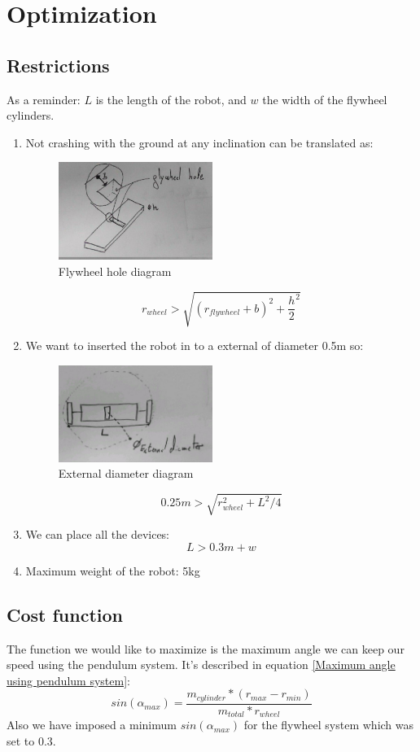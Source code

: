 \section{Optimization}

\subsection{Restrictions}
As a reminder: $L$ is the length of the robot, and $w$ the width of the flywheel cylinders.
\begin{enumerate}
\item Not crashing with the ground at any inclination can be translated as:
\begin{figure}[ht]
	\centering
	\includegraphics[width=5cm]{img/flywheel_hole.jpg}
	\caption{Flywheel hole diagram}
	\label{fig:Flywheel hole diagram}
\end{figure}
\[r_{wheel}> \sqrt{(r_{flywheel} + b)^2+\frac{h}{2}^2}\]
\item We want to inserted the robot in to a external of diameter 0.5m so:
\begin{figure}[ht]
	\centering
	\includegraphics[width=5cm]{img/external_diameter.jpg}
	\caption{External diameter diagram}
	\label{fig:External diameter diagram}
\end{figure}
\[0.25 m > \sqrt{r_{wheel}^2 + L^2/4}\]
\item We can place all the devices:
\[L > 0.3m + w \]
\item Maximum weight of the robot: 5kg
\end{enumerate}


\subsection{Cost function}
The function we would like to maximize is the maximum angle we can keep our speed using the pendulum system.
It's described in equation \ref{Maximum angle using pendulum system}:
\[sin(\alpha_{max}) = \frac{m_{cylinder} * (r_{max}- r_{min})}{m_{total} * r_{wheel}}\]
Also we have imposed a minimum $sin(\alpha_{max})$ for the flywheel system which was set to $0.3$.

